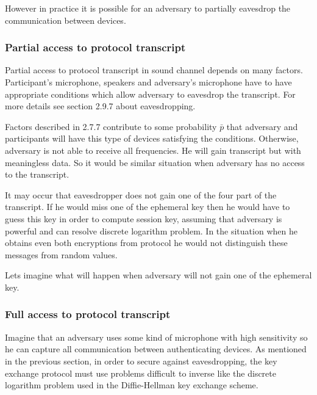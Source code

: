 \documentclass[11pt,titlepage]{article}
\theoremstyle{plain}
\begin{document}
\vspace{5mm}

However in practice it is possible for an adversary to partially eavesdrop the communication between devices.

\subsubsection{Partial access to protocol transcript}

Partial access to protocol transcript in sound channel depends on many factors. Participant's microphone, speakers and adversary's microphone have to have appropriate conditions which allow adversary to eavesdrop the transcript. For more details see section 2.9.7 about eavesdropping.

\vspace{5mm}

Factors described in 2.7.7 contribute to some probability $\bar{p}$ that adversary and participants will have this type of devices satisfying the conditions. Otherwise, adversary is not able to receive all frequencies. He will gain transcript but with meaningless data. So it would be similar situation when adversary has no access to the transcript.  

\vspace{5mm}

It may occur that eavesdropper does not gain one of the four part of the transcript. If he would miss one of the ephemeral key then he would have to guess this key in order to compute session key, assuming that adversary is powerful and can resolve discrete logarithm problem. In the situation when he obtains even both encryptions from protocol he would not distinguish these messages from random values. 

\vspace{5mm}

Lets imagine what will happen when adversary will not gain one of the ephemeral key.
\subsubsection{Full access to protocol transcript}
Imagine that an adversary uses some kind of microphone with high sensitivity so he can capture all communication between authenticating devices. As mentioned in the previous section, in order to secure against eavesdropping, the key exchange protocol must use problems difficult to inverse like the discrete logarithm problem used in the Diffie-Hellman key exchange scheme.
\end{document}
